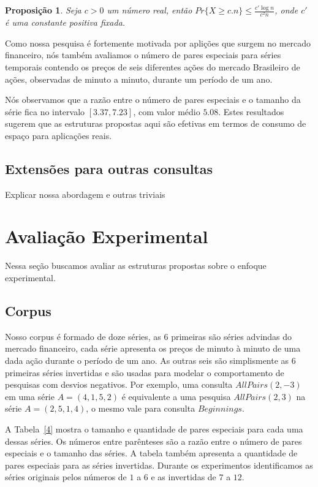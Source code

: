 \documentclass[12pt]{article}
\newtheorem{prop}[thm]{Proposição}
\begin{document}
\begin{prop}
Seja $c>0$ um número real, então $Pr\{X \ge c.n\} \le \frac{c' \log n}{c^2n}$, onde
$c'$ é uma constante positiva fixada.
\end{prop}

Como nossa pesquisa é fortemente motivada por aplições que surgem no mercado
financeiro, nós também avaliamos o número de pares especiais para séries temporais
contendo os preços de seis diferentes ações do mercado Brasileiro de ações, observadas
de minuto a minuto, durante um período de um ano. 

Nós observamos que a razão entre o número de pares especiais e o tamanho da série fica no intervalo
$[3.37, 7.23]$, com valor médio $5.08$. Estes resultados sugerem que as estruturas propostas aqui são
 efetivas em termos de consumo de espaço para aplicações reais.  


\subsection{Extensões para outras consultas}
 Explicar nossa abordagem e outras triviais

\section{Avaliação Experimental}

Nessa seção buscamos avaliar as estruturas propostas sobre o enfoque experimental.


\subsection{Corpus}

Nosso corpus é formado de doze séries, as 6 primeiras são séries advindas do mercado financeiro, 
cada série apresenta os preços de minuto à minuto de uma dada ação durante o período de um ano. 
As outras seis são simplismente as 6 primeiras séries invertidas e são usadas para modelar
o comportamento de pesquisas com desvios negativos. Por exemplo, uma consulta $AllPairs(2, -3)$
em uma série $A=(4, 1, 5, 2)$ é equivalente a uma pesquisa $AllPairs(2, 3)$ na série $A=(2, 5, 1, 4)$,
o mesmo vale para consulta $Beginnings$.

A Tabela~\ref{4} mostra o tamanho e quantidade de pares especiais para cada uma dessas séries.
Os números entre parênteses são a razão entre o número de pares especiais e o tamanho das séries.
A tabela também apresenta a quantidade de pares especiais para as séries invertidas. Durante
os experimentos identificamos as séries originais pelos números de $1$ a $6$ e as invertidas
de $7$ a $12$.
 
\end{document}
